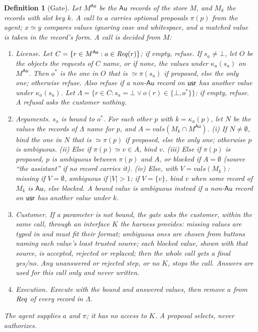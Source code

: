 \documentclass[10pt]{article}
\newtheorem{definition}{Definition}
\newcommand{\Au}{\mathsf{Au}}\newcommand{\At}{\mathsf{At}}\newcommand{\Un}{\mathsf{Un}}
\newcommand{\vals}{\mathit{vals}}\newcommand{\yes}{\textsf{yes}}\newcommand{\no}{\textsf{no}}
\begin{document}
\begin{definition}[Gate]
Let $M^{\Au}$ be the $\Au$ records of the store $M$, and $M_k$ the records with slot key $k$. A call
to $a$ carries optional proposals $\pi(p)$ from the agent; $x \simeq y$ compares values ignoring
case and whitespace, and a matched value is taken in the record's form. A call is decided from $M$:
\begin{enumerate}
\item \emph{License.} Let $C = \{ r \in M^{\Au} : a \in \Req(r) \}$; if empty, refuse. If
  $s_a \neq \bot$, let $O$ be the objects the requests of $C$ name, or if none, the values under
  $\kappa_a(s_a)$ on $M^{\Au}$. Then $o^*$ is the one in $O$ that is $\simeq \pi(s_a)$ if proposed,
  else the only one; otherwise refuse. Also refuse if a non-$\Au$ record on $\mathsf{usr}$ has another
  value under $\kappa_a(s_a)$. Let $\Lambda = \{ r \in C : s_a = \bot \vee o(r) \in \{\bot, o^*\} \}$;
  if empty, refuse. A refusal asks the customer nothing.
\item \emph{Arguments.} $s_a$ is bound to $o^*$. For each other $p$ with $k = \kappa_a(p)$, let $N$
  be the values the records of $\Lambda$ name for $p$, and $A = \vals(M_k \cap M^{\Au})$. (i) If
  $N \neq \emptyset$, bind the one in $N$ that is $\simeq \pi(p)$ if proposed, else the only one;
  otherwise $p$ is ambiguous. (ii) Else if $\pi(p) \simeq v \in A$, bind $v$. (iii) Else if $\pi(p)$ is
  proposed, $p$ is ambiguous between $\pi(p)$ and $A$, or blocked if $A = \emptyset$ (source ``the
  assistant'' if no record carries it). (iv) Else, with $V = \vals(M_k)$: missing if $V = \emptyset$,
  ambiguous if $|V| > 1$; if $V = \{v\}$, bind $v$ when some record of $M_k$ is $\Au$, else blocked.
  A bound value is ambiguous instead if a non-$\Au$ record on $\mathsf{usr}$ has another value under $k$.
\item \emph{Customer.} If a parameter is not bound, the gate asks the customer, within the same
  call, through an interface $K$ the harness provides: missing values are typed in and must fit
  their format; ambiguous ones are chosen from buttons naming each value's least trusted source;
  each blocked value, shown with that source, is accepted, rejected or replaced; then the whole
  call gets a final yes/no. Any unanswered or rejected step, or no $K$, stops the call. Answers
  are used for this call only and never written.
\item \emph{Execution.} Execute with the bound and answered values, then remove $a$ from $\mathit{Req}$ of
  every record in $\Lambda$.
\end{enumerate}
The agent supplies $a$ and $\pi$; it has no access to $K$. A proposal selects, never authorizes.
\end{definition}
\end{document}
